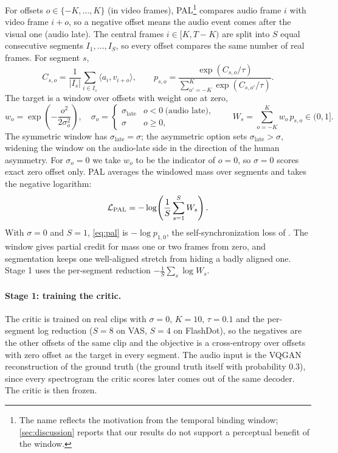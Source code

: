 For offsets $o \in \{-K, \dots, K\}$ (in video frames), PAL\footnote{The name reflects the motivation from the temporal binding window; \cref{sec:discussion} reports that our results do not support a perceptual benefit of the window.} compares audio frame $i$ with video frame $i + o$, so a negative offset means the audio event comes after the visual one (audio late). The central frames $i \in [K, T-K)$ are split into $S$ equal consecutive segments $I_1, \dots, I_S$, so every offset compares the same number of real frames. For segment $s$,
\begin{equation}
  C_{s,o} = \frac{1}{|I_s|} \sum_{i \in I_s} \langle a_i, v_{i+o} \rangle, \qquad
  p_{s,o} = \frac{\exp(C_{s,o}/\tau)}{\sum_{o'=-K}^{K} \exp(C_{s,o'}/\tau)} .
  \label{eq:xcorr}
\end{equation}
The target is a window over offsets with weight one at zero,
\begin{equation}
  w_o = \exp\!\left(-\frac{o^2}{2\sigma_o^2}\right), \quad
  \sigma_o = \begin{cases} \sigma_{\mathrm{late}} & o < 0 \ \text{(audio late)},\\ \sigma & o \geq 0 , \end{cases}
  \qquad W_s = \sum_{o=-K}^{K} w_o \, p_{s,o} \in (0, 1] .
  \label{eq:window}
\end{equation}
The symmetric window has $\sigma_{\mathrm{late}} = \sigma$; the asymmetric option sets $\sigma_{\mathrm{late}} > \sigma$, widening the window on the audio-late side in the direction of the human asymmetry. For $\sigma_o = 0$ we take $w_o$ to be the indicator of $o = 0$, so $\sigma = 0$ scores exact zero offset only. PAL averages the windowed mass over segments and takes the negative logarithm:
\begin{equation}
  \mathcal{L}_{\mathrm{PAL}} = -\log\!\left(\frac{1}{S}\sum_{s=1}^{S} W_s\right).
  \label{eq:pal}
\end{equation}
With $\sigma = 0$ and $S = 1$, \cref{eq:pal} is $-\log p_{1,0}$, the self-synchronization loss of \citet{niu2023synchronization}. The window gives partial credit for mass one or two frames from zero, and segmentation keeps one well-aligned stretch from hiding a badly aligned one. Stage 1 uses the per-segment reduction $-\frac{1}{S}\sum_s \log W_s$.

\paragraph{Stage 1: training the critic.}
The critic is trained on real clips with $\sigma = 0$, $K = 10$, $\tau = 0.1$ and the per-segment log reduction ($S = 8$ on VAS, $S = 4$ on FlashDot), so the negatives are the other offsets of the same clip \citep{owens2018audio,chung2019perfect} and the objective is a cross-entropy over offsets with zero offset as the target in every segment. The audio input is the VQGAN reconstruction of the ground truth (the ground truth itself with probability 0.3), since every spectrogram the critic scores later comes out of the same decoder. The critic is then frozen.

